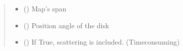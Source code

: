 \documentclass[a4paper,11pt,english]{sphinxmanual}
\begin{document}
\begin{fulllineitems}
\begin{fulllineitems}
\begin{quote}
\begin{description}
\begin{itemize}
\item {} 
\sphinxAtStartPar
{} () \textendash{} Map’s span

\item {} 
\sphinxAtStartPar
{} () \textendash{} Position angle of the disk

\item {} 
\sphinxAtStartPar
{} () \textendash{} If True, scattering is included. (Time\sphinxhyphen{}consuming)

\end{itemize}

\end{description}\end{quote}

\end{fulllineitems}



\end{fulllineitems}
\end{document}
